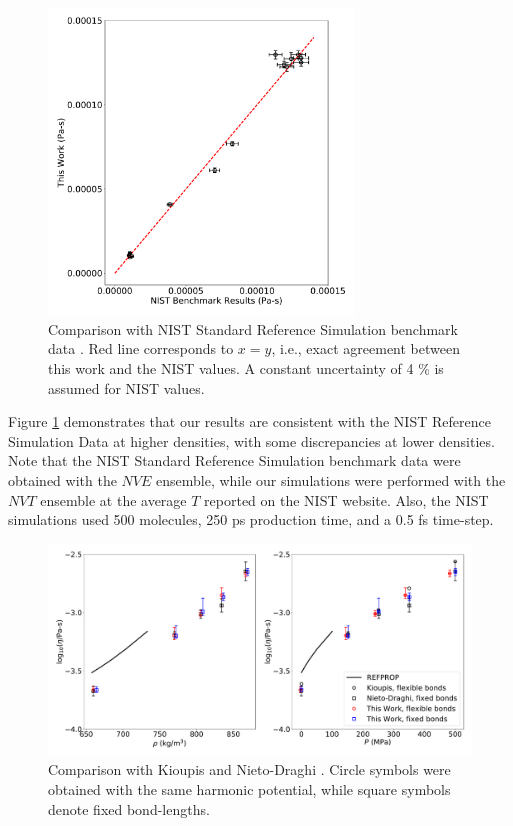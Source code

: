 \documentclass[preprint,review,12pt]{elsarticle}
\begin{document}
	
	\begin{figure}[htb!]
		\centering
		\includegraphics[width=3.2in]{NIST_ethane_TraPPE_validation.pdf}
		\caption{Comparison with NIST Standard Reference Simulation benchmark data \cite{NIST_SRSW}. Red line corresponds to $x = y$, i.e., exact agreement between this work and the NIST values. A constant uncertainty of 4 \% is assumed for NIST values.}
		\label{fig:validation_runs}
	\end{figure} 
	
	Figure \ref{fig:validation_runs} demonstrates that our results are consistent with the NIST Reference Simulation Data at higher densities, with some discrepancies at lower densities. Note that the NIST Standard Reference Simulation benchmark data were obtained with the $NVE$ ensemble, while our simulations were performed with the $NVT$ ensemble at the average $T$ reported on the NIST website. Also, the NIST simulations used 500 molecules, 250 ps production time, and a 0.5 fs time-step.  
	
	\begin{figure}[htb!]
		\centering
		\includegraphics[width=6.4in]{validation_TraPPE_octane.pdf}
		\caption{Comparison with Kioupis \cite{Kioupis2000} and Nieto-Draghi \cite{Nieto2006}. Circle symbols were obtained with the same harmonic potential, while square symbols denote fixed bond-lengths.}
		\label{fig:validation_runs2}
	\end{figure}
	
\end{document}
